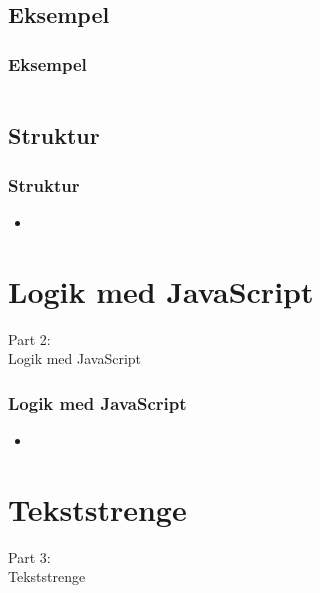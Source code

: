\subsection{Eksempel}
\begin{frame}
    \frametitle{Eksempel}
    \inputminted[breaklines=true]{html}{../src/frontend/iteration1_html/index.html}
\end{frame}

\subsection{Struktur}
\begin{frame}
    \frametitle{Struktur}
    \begin{itemize}
      \item 
    \end{itemize}
\end{frame}

\section{Logik med JavaScript}
\begin{frame}
    \vspace{25mm}
    \begin{center}
        \Huge{Part 2:\\Logik med JavaScript}
    \end{center}
\end{frame}

\begin{frame}
    \frametitle{Logik med JavaScript}
    \begin{itemize}
      \item 
    \end{itemize}
\end{frame}

\section{Tekststrenge}
\begin{frame}
    \vspace{25mm}
    \begin{center}
        \Huge{Part 3:\\Tekststrenge}
    \end{center}
\end{frame}


